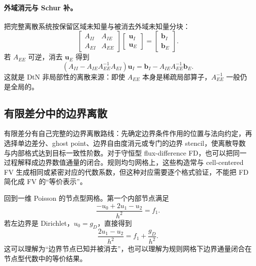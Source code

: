 \paragraph{外域消元与 Schur 补。}
把完整离散系统按保留区域未知量与被消去外域未知量分块：
\begin{equation}
\begin{bmatrix}
A_{II}&A_{IE}\\
A_{EI}&A_{EE}
\end{bmatrix}
\begin{bmatrix}
\bm u_I\\
\bm u_E
\end{bmatrix}
=
\begin{bmatrix}
\bm b_I\\
\bm b_E
\end{bmatrix}.
\end{equation}
若 $A_{EE}$ 可逆，消去 $\bm u_E$ 得到
\begin{equation}
\boxed{
\left(A_{II}-A_{IE}A_{EE}^{-1}A_{EI}\right)\bm u_I
=
\bm b_I-A_{IE}A_{EE}^{-1}\bm b_E.
}
\label{eq:discretization-dtn-schur}
\end{equation}
这就是 DtN 非局部性的离散来源：即使 $A_{EE}$ 本身是稀疏局部算子，$A_{EE}^{-1}$ 一般仍是全局的。

\subsection{有限差分中的边界离散}

有限差分有自己完整的边界离散路线：先确定边界条件作用的位置与法向约定，再选择单边差分、ghost point、边界自由度消元或专门的边界 stencil，使离散导数与内部格式达到目标一致性阶数。对于守恒型 flux-difference FD，也可以把同一过程解释成边界数值通量的闭合。规则均匀网格上，这些构造常与 cell-centered FV 生成相同或紧密对应的代数系数，但这种对应需要逐个格式验证，不能把 FD 简化成 FV 的“等价表示”。

回到一维 Poisson 的节点型网格。第一个内部节点满足
\begin{equation}
\frac{-u_0+2u_1-u_2}{h^2}=f_1.
\label{eq:discretization-bc-first-row-open}
\end{equation}
若左边界是 Dirichlet，$u_0=g_D$，直接得到
\begin{equation}
\boxed{
\frac{2u_1-u_2}{h^2}
=f_1+\frac{g_D}{h^2}.
}
\label{eq:discretization-dirichlet-row}
\end{equation}
这可以理解为“边界节点已知并被消去”，也可以理解为规则网格下边界通量闭合在节点型代数中的等价结果。

